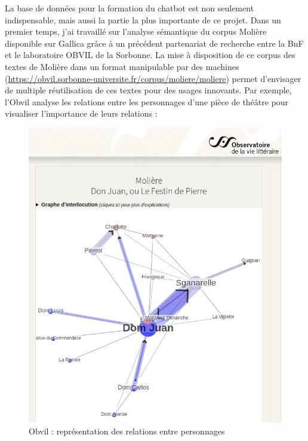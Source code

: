 \documentclass[
  a4paper,
  DIV=11,
  numbers=noendperiod]{scrreprt}
\begin{document}
La base de données pour la formation du chatbot est non seulement
indispensable, mais aussi la partie la plus importante de ce projet.
Dans un premier temps, j'ai travaillé sur l'analyse sémantique du corpus
Molière disponible sur Gallica grâce à un précédent partenariat de
recherche entre la BnF et le laboratoire OBVIL de la Sorbonne. La mise à
disposition de ce corpus des textes de Molière dans un format
manipulable par des machines
(\url{https://obvil.sorbonne-universite.fr/corpus/moliere/moliere})
permet d'envisager de multiple réutilisation de ces textes pour des
usages innovants. Par exemple, l'Obvil analyse les relations entre les
personnages d'une pièce de théâtre pour visualiser l'importance de leurs
relations :

\begin{figure}

{\centering \includegraphics{images/obvil_corpus_moliere_moliere_dom-juan-1682.png}

}

\caption{Obvil : représentation des relations entre personnages}

\end{figure}%
\end{document}
